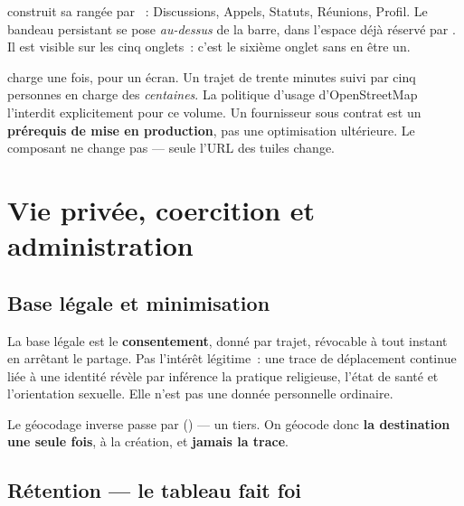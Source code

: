 \begin{constat}
 construit sa rangée par
~: Discussions, Appels, Statuts, Réunions, Profil. Le bandeau
persistant se pose \emph{au-dessus} de la barre, dans l'espace déjà réservé par
. Il est visible sur les cinq onglets~: c'est le sixième onglet sans
en être un.
\end{constat}

\begin{alerte}
 charge  une fois, pour un
écran. Un trajet de trente minutes suivi par cinq personnes en charge des \emph{centaines}.
La politique d'usage d'OpenStreetMap l'interdit explicitement pour ce volume. Un fournisseur
sous contrat est un \textbf{prérequis de mise en production}, pas une optimisation ultérieure.
Le composant  ne change pas --- seule l'URL des tuiles change.
\end{alerte}

\chapter{Vie privée, coercition et administration}

\section{Base légale et minimisation}

La base légale est le \textbf{consentement}, donné par trajet, révocable à tout instant en
arrêtant le partage. Pas l'intérêt légitime~: une trace de déplacement continue liée à une
identité révèle par inférence la pratique religieuse, l'état de santé et l'orientation
sexuelle. Elle n'est pas une donnée personnelle ordinaire.

Le géocodage inverse passe par 
() --- un tiers. On géocode donc
\textbf{la destination une seule fois}, à la création, et \textbf{jamais la trace}.

\section{Rétention --- le tableau fait foi}

